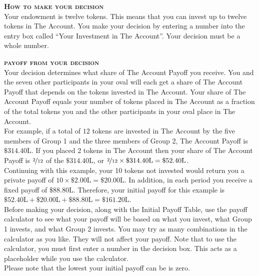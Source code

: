 \documentclass[12pt]{article}
\begin{document}
{\bf \scshape How to make your decision}\\

Your endowment is twelve tokens.  This means that you can invest up to twelve tokens in The Account. You make your decision by entering a number into the entry box called ``Your Investment in The Account''. Your decision must be a whole number.\\ 

\newpage

{\bf \scshape payoff from your decision}\\

Your decision determines what share of The Account Payoff you receive.  You and the seven other participants in your oval will each get a share of The Account Payoff that depends on the tokens invested in The Account.  Your share of The Account Payoff equals your number of tokens placed in The Account as a fraction of the total tokens you and the other participants in your oval place in The Account.\\  

For example, if a total of $12$ tokens are invested in The Account by the five members of Group 1 and the three members of Group 2, The Account Payoff is $\$314.40\text{L}$.  If you placed 2 tokens in The Account then your share of The Account Payoff is $\nicefrac{2}{12}$ of the $\$314.40\text{L}$, or $\nicefrac{2}{12} \times \$314.40\text{L} = \$52.40\text{L}$.\\

Continuing with this example, your 10 tokens not invested would return you a private payoff of $10 \times \$2.00\text{L} = \$20.00\text{L}$. In addition, in each period you receive a fixed payoff of $\$88.80\text{L}$. Therefore, your initial payoff for this example is $\$52.40\text{L} + \$20.00\text{L} + \$88.80\text{L} = \$161.20\text{L}$.\\

Before making your decision, along with the Initial Payoff Table, use the payoff calculator to see what your payoff will be based on what you invest, what Group 1 invests, and what Group 2 invests. You may try as many combinations in the calculator as you like.  They will not affect your payoff. Note that to use the calculator, you must first enter a number in the decision box.  This acts as a placeholder while you use the calculator.\\ 

Please note that the lowest your initial payoff can be is zero.\\ 
\end{document}
